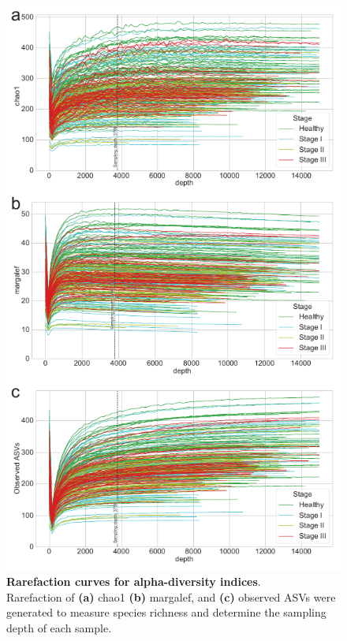 \documentclass[11pt, a4paper, onecolumn, oneside]{report}
\begin{document}
            \begin{figure}[p]
                \centering
                \includegraphics[width=0.75 \linewidth]{Figures/Periodontitis/Figure_S1.pdf}
                \caption[Rarefaction curves for alpha-diversity indices]{\textbf{Rarefaction curves for alpha-diversity indices}. \\
                    Rarefaction of \textbf{(a)} chao1 \textbf{(b)} margalef, and \textbf{(c)} observed ASVs were generated to measure species richness and determine the sampling depth of each sample.}
                \label{fig:Periodontitis-rarefaction}
            \end{figure}
            \clearpage
\end{document}
